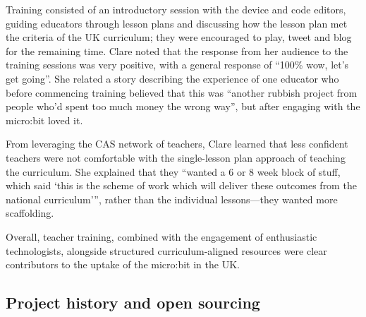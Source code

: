 

Training consisted of an introductory session with the device and code editors, guiding educators through lesson plans and discussing how the lesson plan met the criteria of the UK curriculum; they were encouraged to play, tweet and blog for the remaining time. Clare noted that the response from her audience to the training sessions was very positive, with a general response of ``100\% wow, let's get going''. She related a story describing the experience of one educator who before commencing training believed that this was ``another rubbish project from people who'd spent too much money the wrong way'', but after engaging with the micro:bit loved it. 

From leveraging the CAS network of teachers, Clare learned that less confident teachers were not comfortable with the single-lesson plan approach of teaching the curriculum. She explained that they ``wanted a 6 or 8 week block of stuff, which said `this is the scheme of work which will deliver these outcomes from the national curriculum''', rather than the individual lessons---they wanted more scaffolding.

Overall, teacher training, combined with the engagement of enthusiastic technologists, alongside structured curriculum-aligned resources were clear contributors to the uptake of the micro:bit in the UK.

\subsection{Project history and open sourcing}



